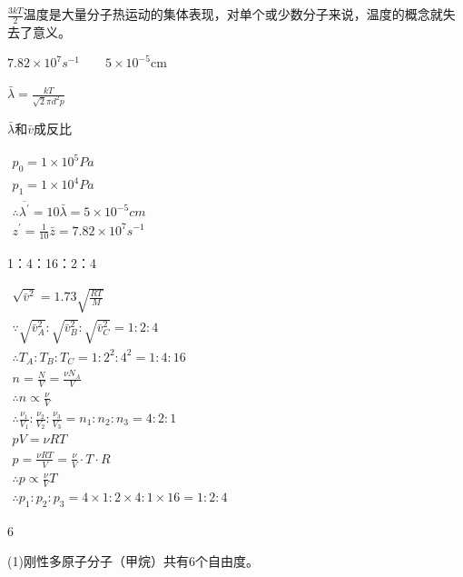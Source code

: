 \documentclass[b5paper,opensource]{./template/qyxf-book}
\begin{document}
$\frac{3kT}{2}$\qquad 温度是大量分子热运动的集体表现，对单个或少数分子来说，温度的概念就失去了意义。

$
7.82 \times 10 ^ { 7 } s ^ { - 1 } \qquad5 \times 10 ^ { - 5 } \mathrm { cm }
$

\solve

$
\bar { \lambda } = \frac { k T } { \sqrt { 2 } \pi d ^ { 2 } p }
$

$\bar { \lambda } $和$\bar { v } $成反比

$
\begin{array} { l } { p _ { 0 } = 1 \times 10 ^ { 5 } P a } \\ { p _ { 1 } = 1 \times 10 ^ { 4 } P a } \\ { \therefore \overline { \lambda ^ { \prime } } = 10 \bar { \lambda } = 5 \times 10 ^ { - 5 } c m } \\ { z ^ { \prime } = \frac { 1 } { 10 } \bar { z } = 7.82 \times 10 ^ { 7 } s ^ { - 1 } } \end{array}
$

1：4：16：2：4

\solve

$
\begin{array}{*{20}{c}} \sqrt { \bar { v } ^ { 2 } } = 1.73 \sqrt { \frac { R T } { M } } \\ \because \sqrt { \bar { v } _ { A } ^ { 2 } } : \sqrt { \bar { v } _ { B } ^ { 2 } }  : \sqrt { \bar { v } _ { C } ^ { 2 } } = 1 : 2 : 4 \\ \therefore T _ { A } : T _ { B } : T _ { C } = 1 : 2 ^ { 2 } : 4 ^ { 2 } = 1 : 4 : 16 \\ n = \frac { N } { V } = \frac { \nu N _ { A } } { V } \\ \therefore n \propto \frac { \nu } { V }\\ \therefore \frac { \nu _ { 1 } } { V _ { 1 } } : \frac { \nu _ { 2 } } { V _ { 2 } } : \frac { \nu _ { 3 } } { V _ { 3 } }  = n _ { 1 } : n _ { 2 } : n _ { 3 } = 4 : 2 : 1 \\ p V  = \nu R T \\ p = \frac { \nu R T } { V }  = \frac { \nu } { V } \cdot T \cdot R \\ \therefore p  \propto \frac { \nu } { V } T \\ \therefore p _ { 1 } : p _ { 2 } : p _ { 3 } = 4 \times 1 : 2 \times 4 : 1 \times 16 = 1 : 2 : 4  \end{array}
$

6

\solve (1)刚性多原子分子（甲烷）共有6个自由度。
\end{document}
